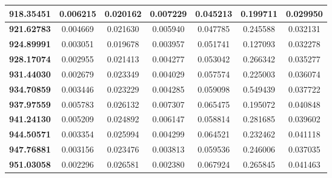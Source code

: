 \documentclass[11pt]{article}
\begin{document}
\begin{appendices}
\begin{longtable}{|c|c|c|c|c|c|c|}
	\textbf{918.35451} & 0.006215 & 0.020162 & 0.007229 & 0.045213 & 0.199711 & 0.029950 \\ \hline
	\textbf{921.62783} & 0.004669 & 0.021630 & 0.005940 & 0.047785 & 0.245588 & 0.032131 \\ \hline
	\textbf{924.89991} & 0.003051 & 0.019678 & 0.003957 & 0.051741 & 0.127093 & 0.032278 \\ \hline
	\textbf{928.17074} & 0.002955 & 0.021413 & 0.004277 & 0.053042 & 0.266342 & 0.035277 \\ \hline
	\textbf{931.44030} & 0.002679 & 0.023349 & 0.004029 & 0.057574 & 0.225003 & 0.036074 \\ \hline
	\textbf{934.70859} & 0.003446 & 0.023229 & 0.004285 & 0.059098 & 0.549439 & 0.037722 \\ \hline
	\textbf{937.97559} & 0.005783 & 0.026132 & 0.007307 & 0.065475 & 0.195072 & 0.040848 \\ \hline
	\textbf{941.24130} & 0.005209 & 0.024892 & 0.006147 & 0.058814 & 0.281685 & 0.039602 \\ \hline
	\textbf{944.50571} & 0.003354 & 0.025994 & 0.004299 & 0.064521 & 0.232462 & 0.041118 \\ \hline
	\textbf{947.76881} & 0.003156 & 0.023476 & 0.003813 & 0.059536 & 0.246006 & 0.037035 \\ \hline
	\textbf{951.03058} & 0.002296 & 0.026581 & 0.002380 & 0.067924 & 0.265845 & 0.041463 \\ \hline
\end{longtable}
\pagebreak


\end{appendices}
\end{document}
